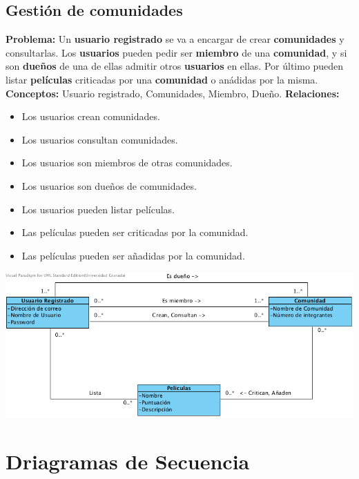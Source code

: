 \documentclass{article}
\begin{document}
	\subsection*{Gestión de comunidades}
	\textbf{Problema:} Un \textbf{usuario registrado} se va a encargar de crear \textbf{comunidades} y consultarlas. Los \textbf{usuarios} pueden pedir ser \textbf{miembro} de una \textbf{comunidad}, y si son \textbf{dueños} de una de ellas admitir otros \textbf{usuarios} en ellas. Por último pueden listar \textbf{películas} criticadas por una \textbf{comunidad} o anádidas por la misma.\\
	\textbf{Conceptos:} Usuario registrado, Comunidades, Miembro, Dueño.
	\textbf{Relaciones:}
		\begin{itemize}
			\item Los usuarios crean comunidades.
			\item Los usuarios consultan comunidades.
			\item Los usuarios son miembros de otras comunidades.
			\item Los usuarios son dueños de comunidades.
			\item Los usuarios pueden listar películas.
			\item Las películas pueden ser criticadas por la comunidad.
			\item Las películas pueden ser añadidas por la comunidad.
		\end{itemize}
		\includegraphics[width=1\linewidth]{./C-Comunidades}
		
\section{Driagramas de Secuencia}
\end{document}
